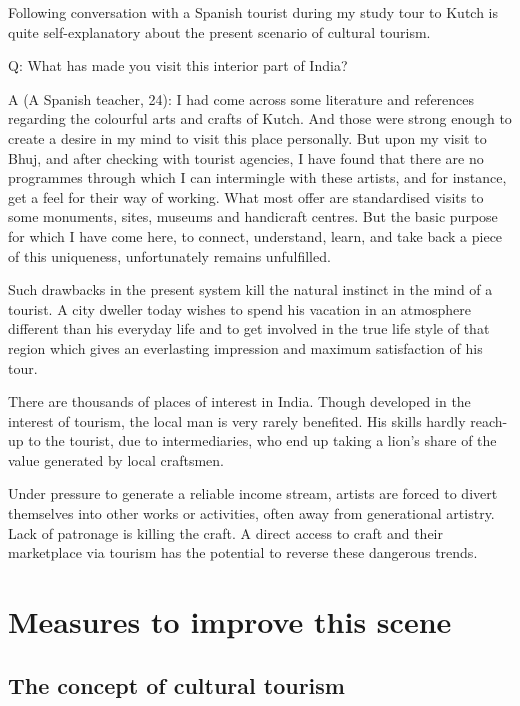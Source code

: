 Following conversation with a Spanish tourist during my study tour to Kutch is quite self-explanatory about the present scenario of cultural tourism.

Q: What has made you visit this interior part of India?

A (A Spanish teacher, 24): I had come across some literature and references regarding the colourful arts and crafts of Kutch. And those were strong enough to create a desire in my mind to visit this place personally. But upon my visit to Bhuj, and after checking with tourist agencies, I have found that there are no programmes through which I can intermingle with these artists, and for instance, get a feel for their way of working. What most offer are standardised visits to some monuments, sites, museums and handicraft centres. But the basic purpose for which I have come here, to connect, understand, learn, and take back a piece of this uniqueness, unfortunately remains unfulfilled.

Such drawbacks in the present system kill the natural instinct in the mind of a tourist. A city dweller today wishes to spend his vacation in an atmosphere different than his everyday life and to get involved in the true life style of that region which gives an everlasting impression and maximum satisfaction of his tour.

There are thousands of places of interest in India. Though developed in the interest of tourism, the local man is very rarely benefited. His skills hardly reach-up to the tourist, due to intermediaries, who end up taking a lion's share of the value generated by local craftsmen.

Under pressure to generate a reliable income stream, artists are forced to divert themselves into other works or activities, often away from generational artistry. Lack of patronage is killing the craft. A direct access to craft and their marketplace via tourism has the potential to reverse these dangerous trends.


\section{Measures to improve this scene} %
\label{sec:measures}

\subsection{The concept of cultural tourism} %
\label{sub:concept_ct}

